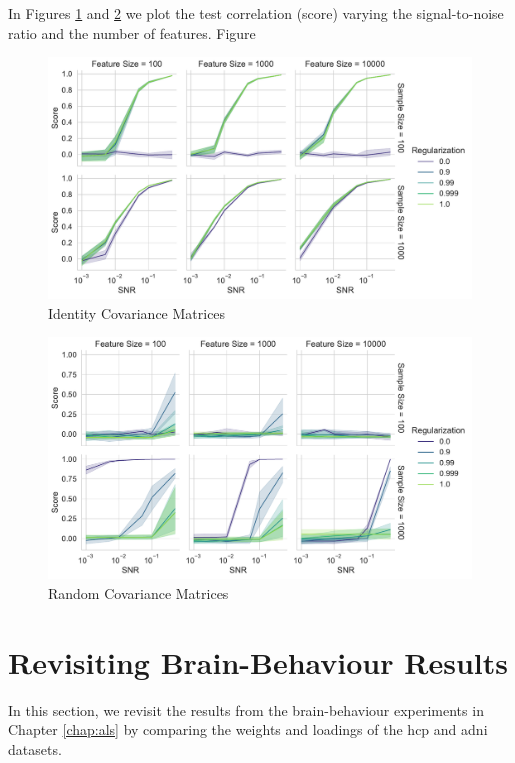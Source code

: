 In Figures \ref{fig:snr-scores-identity} and \ref{fig:snr-scores-random} we plot the test correlation (score) varying the signal-to-noise ratio and the number of features.
Figure 

\begin{figure}
    \centering
    \includegraphics[width=\linewidth]{figures/simulated/snr/snr_vs_scores_facet_identity}
    \caption{Identity Covariance Matrices}\label{fig:snr-scores-identity}
\end{figure}

\begin{figure}
    \centering
    \includegraphics[width=\linewidth]{figures/simulated/snr/snr_vs_scores_facet_random}
    \caption{Random Covariance Matrices}\label{fig:snr-scores-random}
\end{figure}

\section{Revisiting Brain-Behaviour Results}

In this section, we revisit the results from the brain-behaviour experiments in Chapter \ref{chap:als} by comparing the weights and \gls{loadings} of the \acrshort{hcp} and \acrshort{adni} datasets.

